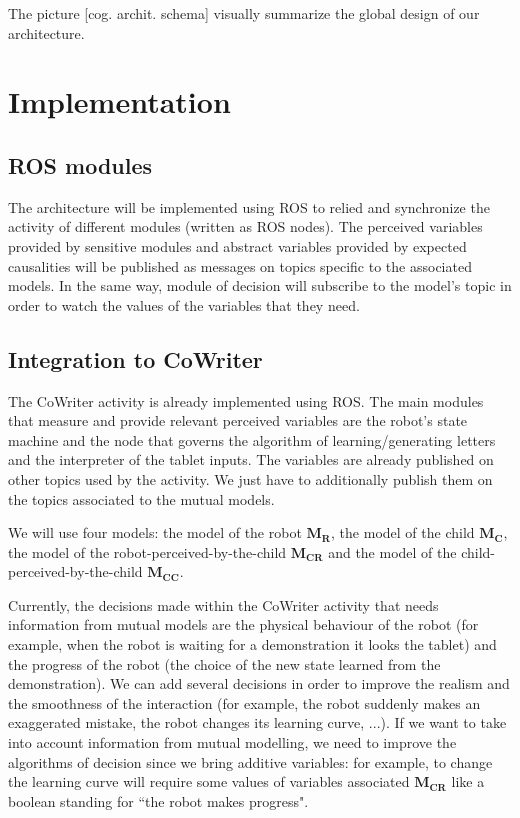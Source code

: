 \documentclass[10pt,a4paper,twocolumn]{article}
\begin{document}
The picture [cog. archit. schema] visually summarize the global design of our architecture. 

\section{Implementation}

\subsection{ROS modules}

The architecture will be implemented using ROS to relied and synchronize the activity of different modules (written as ROS nodes). The perceived variables provided by sensitive modules and abstract variables provided by expected causalities will be published as messages on topics specific to the associated models. In the same way, module of decision will subscribe to the model's topic in order to watch the values of the variables that they need. 

\subsection{Integration to CoWriter}

The CoWriter activity is already implemented using ROS. The main modules that measure and provide relevant perceived variables are the robot's state machine and the node that governs the algorithm of learning/generating letters and the interpreter of the tablet inputs. The variables are already published on other topics used by the activity. We just have to additionally publish them on the topics associated to the mutual models. 

We will use four models: the model of the robot $\textbf{M}_\textbf{R}$, the model of the child $\textbf{M}_\textbf{C}$, the model of the robot-perceived-by-the-child $\textbf{M}_\textbf{CR}$ and the model of the child-perceived-by-the-child $\textbf{M}_\textbf{CC}$.

Currently, the decisions made within the CoWriter activity that needs information from mutual models are the physical behaviour of the robot (for example, when the robot is waiting for a demonstration it looks the tablet) and the progress of the robot (the choice of the new state learned from the demonstration). We can add several decisions in order to improve the realism and the smoothness of the interaction (for example, the robot suddenly makes an exaggerated mistake, the robot changes its learning curve, ...). If we want to take into account information from mutual modelling, we need to improve the algorithms of decision since we bring additive variables: for example, to change the learning curve will require some values of variables associated $\textbf{M}_\textbf{CR}$ like a boolean standing for ``the robot makes progress".
\end{document}

